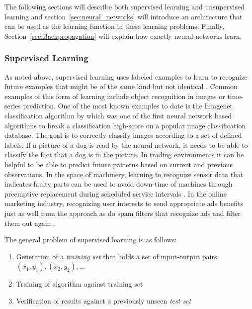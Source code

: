 The following sections will describe both supervised learning and unsupervised learning and section~\ref{sec:neural_networks} will introduce
an architecture that can be used as the learning function in these learning problems. Finally,
Section~\ref{sec:Backpropagation} will explain how exactly neural networks learn.

\subsubsection{Supervised Learning}



As noted above, supervised learning uses labeled examples to learn to recognize future examples that might be of the
same kind but not identical \cite[p.695]{russell2016artificial}. Common examples of this form of learning include object recognition in images or
time-series prediction. One of the most known examples to date is the Imagenet classification algorithm by
\cite[]{krizhevsky2012imagenet} which was one of the first neural network based algorithms to break a classification high-score
on a popular image classification database. The goal is to correctly classify images according to a set of defined
labels. If a picture of a dog is read by the neural network, it needs to be able to classify the fact that a dog is in the
picture. In trading environments it can be helpful to be able to predict future patterns based on current and previous
observations. In the space of machinery, learning to recognize sensor data that indicates faulty parts can be used to
avoid down-time of machines through preemptive replacement during scheduled service intervals \cite[]{rudin2012machine}. In the online marketing
industry, recognizing user interests to send appropriate ads benefits just as well from the approach as do spam filters
that recognize ads and filter them out again \cite[]{domingos2012few}.

The general problem of supervised learning is as follows:

\begin{enumerate}
    \item Generation of a \emph{training set} that holds a set of input-output pairs \\ $(x_1,y_1),(x_2,y_2),\ldots$
    \item Training of algorithm against training set
    \item Verification of results against a previously unseen \emph{test set}
\end{enumerate}

